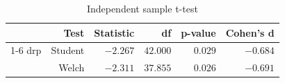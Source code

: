\begin{table}[ht]
	\centering
	\caption{Independent sample t-test}
	\label{tab:ttest}
	{
		\begin{tabular}{lrrrrr}
			\toprule
			$ $ & Test    & Statistic & df       & p-value & Cohen's d \\
			\cmidrule[0.4pt]{1-6}
			drp & Student & $-2.267$  & $42.000$ & $0.029$ & $-0.684$  \\
			$ $ & Welch   & $-2.311$  & $37.855$ & $0.026$ & $-0.691$  \\
			\bottomrule
		\end{tabular}
	}
\end{table}

